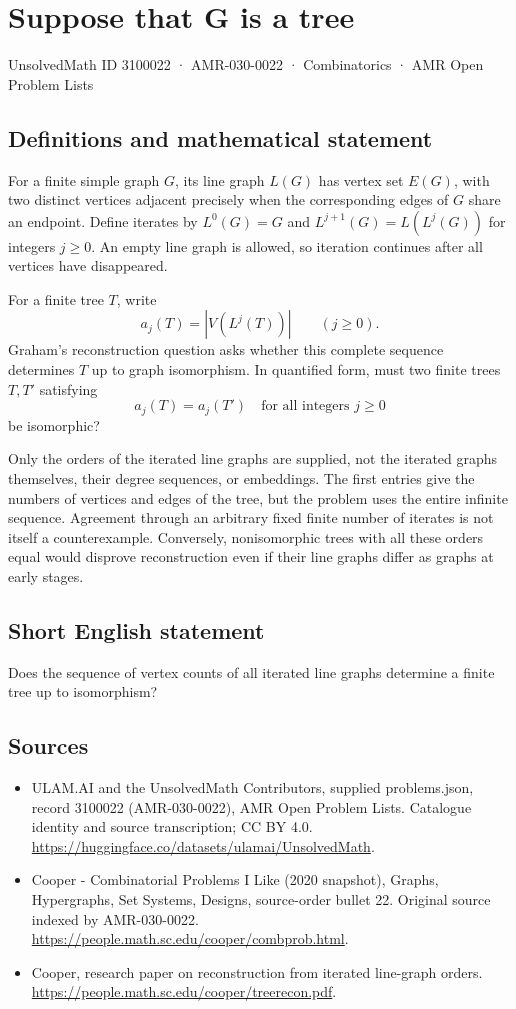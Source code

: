 \documentclass[11pt,a4paper]{article}
\begin{document}
\section*{Suppose that G is a tree}\label{3100022}
{\small UnsolvedMath ID 3100022 · AMR-030-0022 · Combinatorics · AMR Open Problem Lists}
\subsection{Definitions and mathematical statement}
For a finite simple graph $G$, its line graph $L(G)$ has vertex set
$E(G)$, with two distinct vertices adjacent precisely when the
corresponding edges of $G$ share an endpoint. Define iterates by
$L^0(G)=G$ and $L^{j+1}(G)=L(L^j(G))$ for integers $j\ge0$.
An empty line graph is allowed, so iteration continues after all
vertices have disappeared.

For a finite tree $T$, write
\[
                     a_j(T)=|V(L^j(T))|\qquad(j\ge0).
\]
Graham's reconstruction question asks whether this complete
sequence determines $T$ up to graph isomorphism. In quantified
form, must two finite trees $T,T'$ satisfying
\[
              a_j(T)=a_j(T')\quad\text{for all integers }j\ge0
\]
be isomorphic?

Only the orders of the iterated line graphs are supplied, not the
iterated graphs themselves, their degree sequences, or embeddings.
The first entries give the numbers of vertices and edges of the
tree, but the problem uses the entire infinite sequence. Agreement
through an arbitrary fixed finite number of iterates is not itself
a counterexample. Conversely, nonisomorphic trees with all these
orders equal would disprove reconstruction even if their line
graphs differ as graphs at early stages.
\subsection{Short English statement}
Does the sequence of vertex counts of all iterated line graphs determine a finite tree up to isomorphism?
\subsection{Sources}
\begin{itemize}
\item[S1] ULAM.AI and the UnsolvedMath Contributors, supplied problems.json, record 3100022 (AMR-030-0022), AMR Open Problem Lists. Catalogue identity and source transcription; CC BY 4.0.
\url{https://huggingface.co/datasets/ulamai/UnsolvedMath}.
\item[S2] Cooper - Combinatorial Problems I Like (2020 snapshot), Graphs, Hypergraphs, Set Systems, Designs, source-order bullet 22. Original source indexed by AMR-030-0022.
\url{https://people.math.sc.edu/cooper/combprob.html}.
\item[S3] Cooper, research paper on reconstruction from iterated line-graph orders.
\url{https://people.math.sc.edu/cooper/treerecon.pdf}.
\end{itemize}
\end{document}
